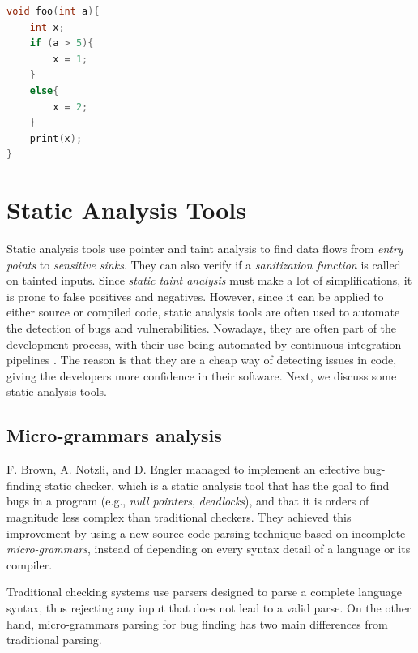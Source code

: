 \begin{lstlisting}[language=C,caption={Implicit information flow},label=implicit,captionpos=b]
void foo(int a){
    int x;
    if (a > 5){
        x = 1;
    }
    else{
        x = 2;
    }
    print(x);
}
\end{lstlisting}


\section{Static Analysis Tools}
\label{static}
Static analysis tools use pointer and taint analysis to find data flows from \textit{entry points} to \textit{sensitive sinks}. They can also verify if a \textit{sanitization function} is called on tainted inputs. Since \textit{static taint analysis} must make a lot of simplifications, it is prone to false positives and negatives. 
However, since it can be applied to either source or compiled code, static analysis tools are often used to automate the detection of bugs and vulnerabilities. Nowadays, they are often part of the development process, with their use being automated by continuous integration pipelines \cite{mohammad2016continuous}. The reason is that they are a cheap way of detecting issues in code, giving the developers more confidence in their software. Next, we discuss some static analysis tools.

\subsection{Micro-grammars analysis}

F. Brown, A. Notzli, and D. Engler \cite{microgrammars} managed to implement an effective bug-finding static checker, which is a static analysis tool that has the goal to find bugs in a program (e.g., \textit{null pointers}, \textit{deadlocks}), and that it is orders of magnitude less complex than traditional checkers. 
They achieved this improvement by using a new source code parsing technique based on incomplete \textit{micro-grammars}, instead of depending on every syntax detail of a language or its compiler.

Traditional checking systems use parsers designed to parse a complete language syntax, thus rejecting any input that does not lead to a valid parse. On the other hand, micro-grammars parsing for bug finding has two main differences from traditional parsing.

